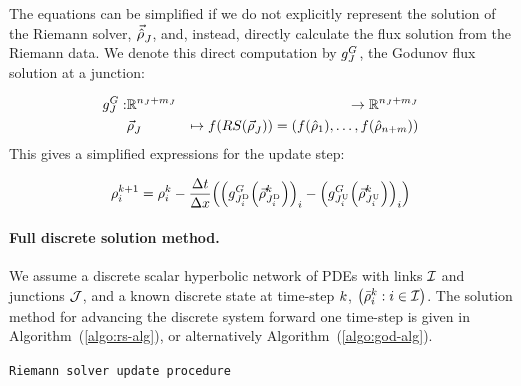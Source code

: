						The equations can be simplified if we do not explicitly represent
						the solution of the Riemann solver, $\vec{\hat{\rho}}_{J}^{}$, and, instead,
						directly calculate the flux solution from the Riemann data. We denote
						this direct computation by $g^{G}_{J}$, the Godunov flux solution
						at a junction:
												
						\begin{eqnarray}
							\god_{\jn}: & \mathbb{R}^{\ninc_{\jn}+\nout_{\jn}} & \rightarrow\mathbb{R}^{\ninc_{\jn}+\nout_{\jn}}\nonumber \\
							& \juncstate{\jn}{} & \mapsto f\left(RS\left(\juncstate{\jn}{}\right)\right)=\left(f\left(\trace{\dvar}_{1}\right),\ldots,f\left(\trace{\dvar}_{\ninc+\nout}\right)\right)\label{eq:god-jn}
						\end{eqnarray}
						This gives a simplified expressions for the update step:
												
						\begin{equation}
							\discrete{\link}{\tind+1}=\discrete{\link}{\tind}-\dfrac{\Delta t}{\Delta x}\left(\left(\god_{\jdown{\link}}\left(\juncstate{\jdown{\link}}{\tind}\right)\right)_{\link}-\left(\god_{\jup{\link}}\left(\juncstate{\jup{\link}}{\tind}\right)\right)_{\link}\right)\label{eq:composed-flux}
						\end{equation}
												
												
												
						\paragraph{Full discrete solution method.\label{par:Full-solution-method}}
												
						We assume a discrete scalar hyperbolic network of PDEs with links
						$\mathcal{I}$ and junctions $\mathcal{J}$, and a known discrete state at time-step
						$k$, $\left(\initdiscrete_{\link}^{\tind}:\link\in\links\right)$.
						The solution method for advancing the discrete system forward one
						time-step is given in Algorithm~(\ref{algo:rs-alg}), or alternatively
						Algorithm~(\ref{algo:god-alg}).
												
						\begin{algorithm}[H]
							\caption{\texttt{Riemann solver update procedure}}
														
														
							
						\end{algorithm}
												
